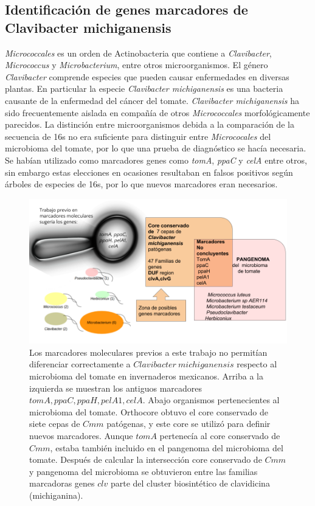 \documentclass[12pt,twoside]{reedthesis}
\begin{document}
  \subsection{Identificación de genes marcadores de Clavibacter
  michiganensis}\label{identificacion-de-genes-marcadores-de-clavibacter-michiganensis}
  
  \emph{Micrococcales} es un orden de Actinobacteria que contiene a
  \emph{Clavibacter}, \emph{Micrococcus} y \emph{Microbacterium}, entre
  otros microorganismos. El género \emph{Clavibacter} comprende especies
  que pueden causar enfermedades en diversas plantas. En particular la
  especie \emph{Clavibacter michiganensis} es una bacteria causante de la
  enfermedad del cáncer del tomate. \emph{Clavibacter michiganensis} ha
  sido frecuentemente aislada en compañía de otros \emph{Micrococcales}
  morfológicamente parecidos. La distinción entre microorganismos debida a
  la comparación de la secuencia de 16s no era suficiente para distinguir
  entre \emph{Micrococales} del microbioma del tomate, por lo que una
  prueba de diagnóstico se hacía necesaria. Se habían utilizado como
  marcadores genes como \emph{tomA}, \emph{ppaC} y \emph{celA} entre
  otros, sin embargo estas elecciones en ocasiones resultaban en falsos
  positivos según árboles de especies de 16s, por lo que nuevos marcadores
  eran necesarios.
  
  \begin{figure}[h!tbp]
  \centering
  \includegraphics[angle = 0,scale = .5]{chapter1/Marcadores-Clavibacter.png}
  \caption[Los genes del cluster biosintético clv son marcadores de $Clavibacter$]{\footnotesize{Los marcadores moleculares previos a este trabajo no permitían diferenciar correctamente a $Clavibacter~michiganensis$ respecto al microbioma del tomate en invernaderos mexicanos. Arriba a la izquierda se muestran los antiguos marcadores $tomA, ppaC, ppaH, pelA1, celA$. Abajo organismos pertenecientes al microbioma del tomate. Orthocore obtuvo el core conservado de siete cepas de $Cmm$ patógenas, y este core se utilizó para definir nuevos marcadores. Aunque $tomA$ pertenecía al core conservado de $Cmm$, estaba también incluido en el pangenoma del microbioma del tomate. Después de calcular la intersección core conservado de $Cmm$ y pangenoma del microbioma se obtuvieron entre las familias marcadoras genes $clv$ parte del cluster biosintético de clavidicina (michiganina).}}
  \label{fig:Marcadores}
  \end{figure}
  
\end{document}

